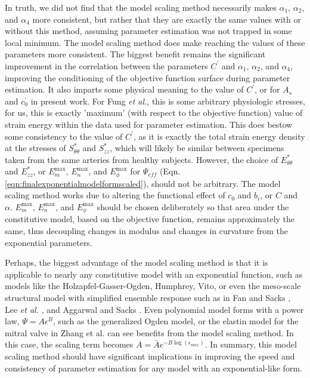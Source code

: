     In truth, we did not find that the model scaling method necessarily makes $\alpha_1$, $\alpha_2$, and $\alpha_4$ more consistent, but rather that they are exactly the same values with or without this method, assuming parameter estimation was not trapped in some local minimum. The model scaling method does make reaching the values of these parameters more consistent. The biggest benefit remains the significant improvement in the correlation between the parameters $C^\prime$ and $\alpha_1$, $\alpha_2$, and $\alpha_4$, improving the conditioning of the objective function surface during parameter estimation. It also imparts some physical meaning to the value of $C^\prime$, or for $A_s$ and $c_0^\prime$ in present work. For Fung \textit{et al.}, this is some arbitrary physiologic stresses, for us, this is exactly 'maximum' (with respect to the objective function) value of strain energy within the data used for parameter estimation. This does bestow some consistency to the value of $C^\prime$, as it is exactly the total strain energy density at the stresses of $S_{\theta\theta}^*$ and $S_{zz}^*$, which will likely be similar between specimens taken from the same arteries from healthy subjects. However, the choice of $E_{\theta\theta}^*$ and $E_{zz}^*$, or $E_m^\mathrm{max}$, $E_n^\mathrm{max}$, and $E_\phi^\mathrm{max}$ for $\Psi_{eff}$ (Eqn. \ref{eqn:finalexponentialmodelformscaled}), should not be arbitrary. The model scaling method works due to altering the functional effect of $c_0$ and $b_i$, or $C$ and $\alpha$. $E_m^\mathrm{max}$, $E_n^\mathrm{max}$, and $E_\phi^\mathrm{max}$ should be chosen deliberately so that area under the constitutive model, based on the objective function, remains approximately the same, thus decoupling changes in modulus and changes in curvature from the exponential parameters. 


    Perhaps, the biggest advantage of the model scaling method is that it is applicable to nearly any constitutive model with an exponential function, such as models like the Holzapfel-Gasser-Ogden, Humphrey, Vito, or even the meso-scale structural model with simplified ensemble response such as in Fan and Sacks \cite{fan_simulation_2014}, Lee \textit{et al.} \cite{lee_effects_2015}, and Aggarwal and Sacks \cite{aggarwal_inverse_2015}. Even polynomial model forms with a power law, $\Psi=A\epsilon^B$, such as the generalized Ogden model, or the elastin model for the mitral valve in Zhang et al. \cite{zhang_meso_2016} can see benefits from the model scaling method. In this case, the scaling term becomes $A = \bar{A} e^{-B \log(\epsilon_{max})}$. In summary, this model scaling method should have significant implications in improving the speed and consistency of parameter estimation for any model with an exponential-like form.
    
